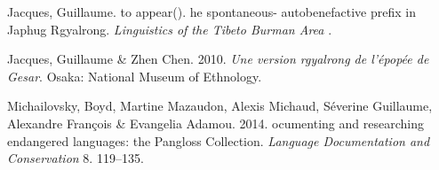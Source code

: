\begin{thebibliography}{10}
Jacques, Guillaume. to appear{()}.
he spontaneous- autobenefactive prefix in {J}aphug {R}gyalrong.
\newblock \emph{Linguistics of the Tibeto Burman Area} .

Jacques, Guillaume \& Zhen Chen. 2010.
\newblock \emph{{U}ne version rgyalrong de l'épopée de {G}esar}.
\newblock Osaka: National Museum of Ethnology.

Michailovsky, Boyd, Martine Mazaudon, Alexis Michaud, Séverine Guillaume,
  Alexandre François \& Evangelia Adamou. 2014.
ocumenting and researching endangered languages: the {P}angloss
  {C}ollection.
\newblock \emph{Language Documentation and Conservation} 8. 119–135.

\end{thebibliography}
